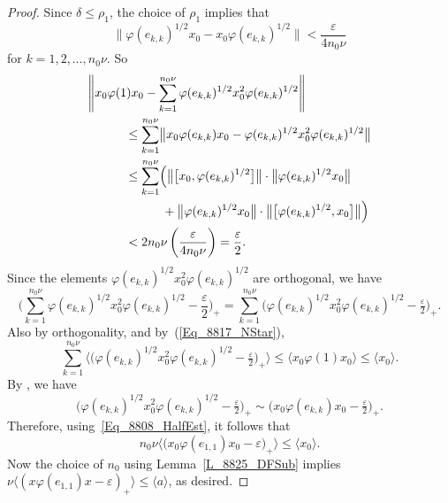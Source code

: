 \documentclass[11pt]{amsart}
\theoremstyle{plain}
\theoremstyle{definition}
\theoremstyle{remark}
\numberwithin{equation}{section}
\newcommand{\dt}{\delta}
\newcommand{\ep}{\varepsilon}
\newcommand{\ph}{\varphi}
\newcommand{\rh}{\rho}
\begin{document}
\begin{proof}
Since $\dt \leq \rh_1$,
the choice of $\rh_1$ implies that
\[
\bigl\| \ph (e_{k, k})^{1/2} x_0 - x_0 \ph (e_{k, k})^{1/2} \bigr\|
 < \frac{\ep}{4 n_0 \nu}
\]
for $k = 1, 2, \ldots, n_0 \nu$.
So
%
\begin{align}\label{Eq_8817_NStar}
& \Biggl\| x_0 \ph (1) x_0
  - \sum_{k = 1}^{n_0 \nu}
       \ph (e_{k, k})^{1/2} x_0^2 \ph (e_{k, k})^{1/2} \Biggr\|
\\
& \hspace*{3em} {\mbox{}}
\leq \sum_{k = 1}^{n_0 \nu}
  \bigl\| x_0 \ph (e_{k, k}) x_0
       - \ph (e_{k, k})^{1/2} x_0^2 \ph (e_{k, k})^{1/2} \bigr\|
\notag
\\
& \hspace*{3em} {\mbox{}}
\leq \sum_{k = 1}^{n_0 \nu} \Bigl(
   \bigl\| \bigl[x_0, \ph (e_{k, k})^{1/2} \bigr] \bigr\|\cdot
            \bigl\| \ph (e_{k, k})^{1/2} x_0 \bigr\|
\notag
\\
& \hspace*{6em} {\mbox{}}
      + \bigl\| \ph (e_{k, k})^{1/2}x_0  \bigr\| \cdot
           \bigl\| \bigl[ \ph (e_{k, k})^{1/2}, x_0 \bigr] \bigr\|
    \Bigr)
\notag
\\
& \hspace*{3em} {\mbox{}}
 < 2 n_0 \nu \left( \frac{\ep}{4 n_0 \nu} \right)
 = \frac{\ep}{2}.
\notag
\end{align}
%
Since the elements
$\ph (e_{k, k})^{1/2} x_0^2 \ph (e_{k, k})^{1/2}$
are orthogonal,
we have
\[
\Biggl( \sum_{k = 1}^{n_0 \nu}
   \ph (e_{k, k})^{1/2} x_0^2 \ph (e_{k, k})^{1/2}
      - \frac{\ep}{2} \Biggr)_{+}
  = \sum_{k = 1}^{n_0 \nu}
      \bigl( \ph (e_{k, k})^{1/2} x_0^2 \ph (e_{k, k})^{1/2}
      - \tfrac{\ep}{2} \bigr)_{+}.
\]
Also by orthogonality,
and by~(\ref{Eq_8817_NStar}),
\[
\sum_{k = 1}^{n_0 \nu}
  \bigl\langle \bigl( \ph (e_{k, k})^{1/2} x_0^2 \ph (e_{k, k})^{1/2}
      - \tfrac{\ep}{2} \bigr)_{+} \bigr\rangle
 \leq \langle x_0 \ph (1) x_0 \rangle
 \leq \langle x_0 \rangle.
\]
By \cite[Proposition 2.3(ii)]{ERS},
we have
\[
\bigl( \ph (e_{k, k})^{1/2} x_0^2 \ph (e_{k, k})^{1/2}
      - \tfrac{\ep}{2} \bigr)_{+}
   \sim \bigl( x_0 \ph (e_{k, k}) x_0
      - \tfrac{\ep}{2} \bigr)_{+}.
\]
Therefore, using~\eqref{Eq_8808_HalfEst},
it follows that
\[
n_0 \nu \bigl\langle \bigl( x_0 \ph (e_{1, 1}) x_0 - \ep \bigr)_{+}
           \bigr\rangle
 \leq \langle x_0 \rangle.
\]
Now the choice of $n_0$ using Lemma~\ref{L_8825_DFSub}
implies
$\nu \bigl\langle ( x \ph (e_{1, 1}) x - \varepsilon )_{+} \bigr\rangle
 \leq \langle a \rangle$,
as desired.
\end{proof}
\end{document}
